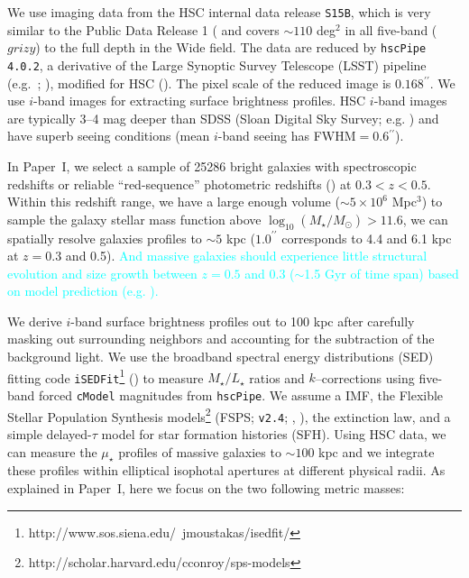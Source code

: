 \documentclass[a4paper,fleqn,usenatbib]{mnras}
\def\arcsec{{\prime\prime}}
\def\asec{$^{\prime\prime}$}
\def\cmodel{\texttt{cModel}}
\def\logms{{$\log_{10} (M_{\star}/M_{\odot})$}}
\def\m2l{{$M_{\star}/L_{\star}$}}
\def\mden{{$\mu_{\star}$}}
\newcommand{\song}[1]{\textcolor{cyan}{#1}}
\begin{document}
    We use imaging data from the HSC internal data release 
    \texttt{S15B}, which is very similar to the Public Data Release 1 
    (\citealt{HSC-DR1} and covers ${\sim} 110$ deg$^2$ in all five-band ($grizy$) to 
    the full depth in the Wide field. 
    The data are reduced by \texttt{hscPipe 4.0.2}, a derivative of the 
    Large Synoptic Survey Telescope (LSST) pipeline (e.g.\ \citealt{Juric2015}; 
    \citealt{Axelrod2010}), modified for HSC (\citealt{HSC-PIPE}).
    The pixel scale of the reduced image is $0.168$\asec{}.
    We use $i$-band images for extracting surface brightness profiles. 
    HSC $i$-band images are typically 3--4 mag deeper than SDSS 
    (Sloan Digital Sky Survey; e.g. \citealt{SDSS-DR7, SDSS-DR8, SDSS-DR12})  
    and have superb seeing conditions (mean $i$-band seeing has FWHM$=0.6$\asec{}).
    
    In Paper~I, we select a sample of 25286 bright galaxies with spectroscopic 
    redshifts or reliable ``red-sequence'' photometric redshifts (\citealt{Rykoff2014}) 
    at $0.3<z<0.5$. 
    Within this redshift range, we have a large enough volume 
    ($\sim5\times 10^6$ Mpc$^3$) to sample the galaxy stellar mass function above 
    \logms$>11.6$, we can spatially resolve galaxies profiles to $\sim 5$ kpc 
    ($1.0^{\arcsec}$ corresponds to 4.4 and 6.1 kpc at $z=0.3$ and 0.5). 
    \song{
    And massive galaxies should experience little structural evolution and 
    size growth between $z=0.5$ and 0.3 ($\sim$1.5 Gyr of time span) 
    based on model prediction (e.g. \citealt{Shankar2015}).
    }
    
    We derive $i$-band surface brightness profiles out to 100 kpc after carefully 
    masking out surrounding neighbors and accounting for the subtraction of the 
    background light. 
    We use the broadband spectral energy distributions (SED) fitting code 
    \texttt{iSEDFit}\footnote{http://www.sos.siena.edu/~jmoustakas/isedfit/} 
    (\citealt{Moustakas13}) to measure \m2l{} ratios and $k$--corrections using 
    five-band forced \cmodel{} magnitudes from \texttt{hscPipe}. 
    We assume a \citet{Chabrier2003} IMF, the Flexible Stellar Population 
    Synthesis models\footnote{http://scholar.harvard.edu/cconroy/sps-models}
    (FSPS; \texttt{v2.4}; \citealt{FSPS}, \citealt{Conroy2010}), the 
    \citet{Calzetti2000} extinction law, and a simple delayed-$\tau$ model for 
    star formation histories (SFH). 
    Using HSC data, we can measure the \mden{} profiles of massive galaxies to 
    $\sim 100$ kpc and we integrate these profiles within elliptical isophotal
    apertures at different physical radii. 
    As explained in Paper~I, here we focus on the two following metric masses:
        
\end{document}
